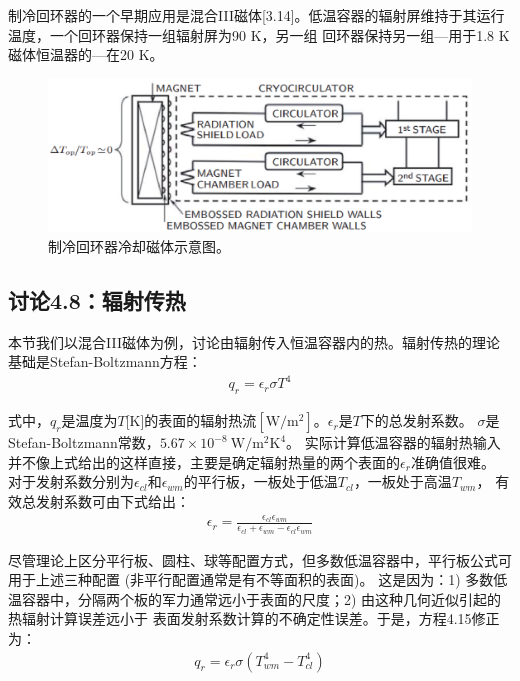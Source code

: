 制冷回环器的一个早期应用是混合III磁体[3.14]。低温容器的辐射屏维持于其运行温度，一个回环器保持一组辐射屏为90 K，另一组
回环器保持另一组---用于1.8 K磁体恒温器的---在20 K。

\begin{figure}[htbp]
	\centering
	\includegraphics[scale=0.6]{chpt4/figs/fig4.15.eps}
	\caption{制冷回环器冷却磁体示意图。}
\end{figure}



\subsection{讨论4.8：辐射传热}
本节我们以混合III磁体为例，讨论由辐射传入恒温容器内的热。辐射传热的理论基础是Stefan-Boltzmann方程：
\begin{align}%
q_r=\epsilon_r\sigma T^4
\end{align}

式中，$q_r$是温度为$T$[K]的表面的辐射热流$[\mathrm{W/m^2}]$。$\epsilon_r$是$T$下的总发射系数。
$\sigma$是Stefan-Boltzmann常数，$5.67\times 10^{-8}\ \mathrm{W/m^2 K^4}$。
实际计算低温容器的辐射热输入并不像上式给出的这样直接，主要是确定辐射热量的两个表面的$\epsilon_r$准确值很难。
对于发射系数分别为$\epsilon_{cl}$和$\epsilon_{wm}$的平行板，一板处于低温$T_{cl}$，一板处于高温$T_{wm}$，
有效总发射系数可由下式给出：
\begin{align}%
\epsilon_r=\frac{\epsilon_{cl}\epsilon_{wm}}{\epsilon_{cl}+\epsilon_{wm}-\epsilon_{cl}\epsilon_{wm}}
\end{align}

尽管理论上区分平行板、圆柱、球等配置方式，但多数低温容器中，平行板公式可用于上述三种配置
(非平行配置通常是有不等面积的表面)。
这是因为：1) 多数低温容器中，分隔两个板的军力通常远小于表面的尺度；2) 由这种几何近似引起的热辐射计算误差远小于
表面发射系数计算的不确定性误差。于是，方程4.15修正为：
\begin{align}%
q_r=\epsilon_r\sigma(T_{wm}^4-T_{cl}^4)
\end{align}

